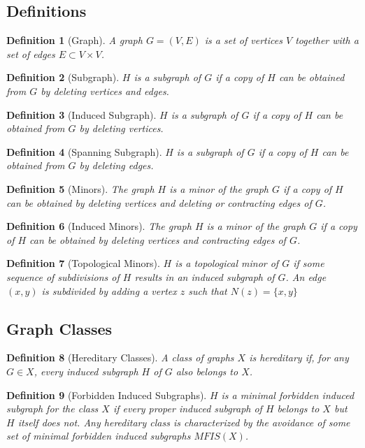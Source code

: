 \documentclass[]{article}
\theoremstyle{break}
\theoremstyle{break}
\newtheorem{definition}{Definition}[section]
\begin{document}
\subsection{Definitions}
\begin{definition}[Graph]
	A graph $G=(V,E)$ is a set of vertices $V$ together with a set of edges $E \subset V \times V$.
\end{definition}
\begin{definition}[Subgraph]
	$H$ is a subgraph of $G$ if a copy of $H$ can be obtained from $G$ by deleting vertices and edges. 
\end{definition}
\begin{definition}[Induced Subgraph]
	$H$ is a subgraph of $G$ if a copy of $H$ can be obtained from $G$ by deleting vertices.
\end{definition}
\begin{definition}[Spanning Subgraph]
	$H$ is a subgraph of $G$ if a copy of $H$ can be obtained from $G$ by deleting edges.
\end{definition}
\begin{definition}[Minors]
	The graph $H$ is a minor of the graph $G$ if a copy of $H$ can be obtained by deleting vertices and deleting or contracting edges of $G$. 
\end{definition}
\begin{definition}[Induced Minors]
	The graph $H$ is a minor of the graph $G$ if a copy of $H$ can be obtained by deleting vertices and contracting edges of $G$. 
\end{definition}
\begin{definition}[Topological Minors]
	$H$ is a topological minor of $G$ if some sequence of subdivisions of $H$ results in an induced subgraph of $G$. An edge $(x,y)$ is subdivided by adding a vertex $z$ such that $N(z)= \{x,y\}$ 
\end{definition}

\subsection{Graph Classes}
	\begin{definition}[Hereditary Classes]
		A class of graphs $X$ is hereditary if, for any $G \in X$, every induced subgraph $H$ of $G$ also belongs to $X$.
	\end{definition}
	
	\begin{definition} [Forbidden Induced Subgraphs]
		$H$ is a minimal forbidden induced subgraph for the class $X$ if every proper induced subgraph of $H$ belongs to $X$ but $H$ itself does not. Any hereditary class is characterized by the avoidance of some set of minimal forbidden induced subgraphs $MFIS(X)$.
	\end{definition}
\end{document}
